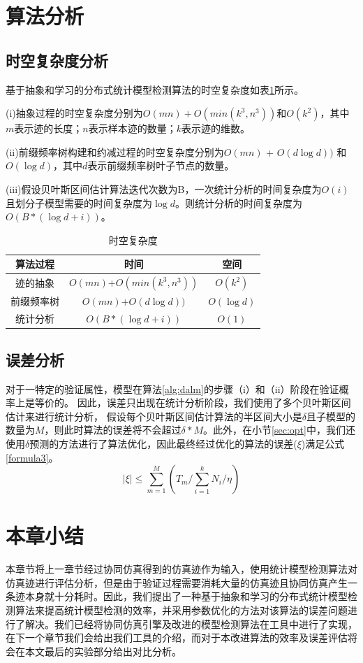\section{算法分析}
\subsection{时空复杂度分析}
基于抽象和学习的分布式统计模型检测算法的时空复杂度如表\ref{tb:complexity}所示。

(i)抽象过程的时空复杂度分别为$O(mn)+O(min(k^3,n^3))$和$O(k^2)$，其中 $m$表示迹的长度；$n$表示样本迹的数量；$k$表示迹的维数。 

(ii)前缀频率树构建和约减过程的时空复杂度分别为$O(mn)$ + $O(d\log{d}))$ 和$O(\log{d})$，其中$d$表示前缀频率树叶子节点的数量。

(iii)假设贝叶斯区间估计算法迭代次数为B，一次统计分析的时间复杂度为$O(i)$且划分子模型需要的时间复杂度为$\log{d}$。则统计分析的时间复杂度为 $O(B*(\log{d}+i))$。


\begin{table}[t]
	\caption{时空复杂度}
	\label{tb:complexity}
	\centering
	\begin{tabular}{c c c}
	    \hline
		算法过程 & 时间  & 空间 \\
		\hline
		迹的抽象 & $O(mn)$+$O(min(k^3,n^3))$ & $O(k^2)$ \\ 
		\hline
		前缀频率树 &$O(mn)$+$O(d\log{d}))$ & $O(\log{d})$ \\
		\hline
		统计分析 & $O(B*(\log{d}+i))$ & $O(1)$\\	
		\hline
	\end{tabular}
\end{table}

\subsection{误差分析}
对于一特定的验证属性，模型在算法\ref{alg:dalm}的步骤（i）和（ii）阶段在验证概率上是等价的。 因此，误差只出现在统计分析阶段，我们使用了多个贝叶斯区间估计来进行统计分析， 假设每个贝叶斯区间估计算法的半区间大小是$\delta$且子模型的数量为$M$，则此时算法的误差将不会超过$\delta*M$。此外，在小节\ref{sec:opt}中，我们还使用$\delta$预测的方法进行了算法优化，因此最终经过优化的算法的误差($\xi$)满足公式\ref{formula3}。
\begin{equation}
\label{formula3}
| \xi | \leq \sum\limits_{m=1}^M (T_m / \sum\limits_{i=1}^k N_i / \eta)
\end{equation}
\section{本章小结}
本章节将上一章节经过协同仿真得到的仿真迹作为输入，使用统计模型检测算法对仿真迹进行评估分析，但是由于验证过程需要消耗大量的仿真迹且协同仿真产生一条迹本身就十分耗时。因此，我们提出了一种基于抽象和学习的分布式统计模型检测算法来提高统计模型检测的效率，并采用参数优化的方法对该算法的误差问题进行了解决。我们已经将协同仿真引擎及改进的模型检测算法在工具中进行了实现，在下一个章节我们会给出我们工具的介绍，而对于本改进算法的效率及误差评估将会在本文最后的实验部分给出对比分析。
